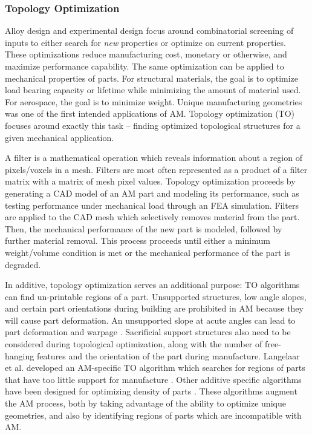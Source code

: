 \subsubsection{Topology Optimization}
Alloy design and experimental design focus around combinatorial screening of inputs to either search for \textit{new} properties or optimize on current properties. These optimizations reduce manufacturing cost, monetary or otherwise, and maximize performance capability. The same optimization can be applied to mechanical properties of parts. For structural materials, the goal is to optimize load bearing capacity or lifetime while minimizing the amount of material used. For aerospace, the goal is to minimize weight. Unique manufacturing geometries was one of the first intended applications of AM. Topology optimization (TO) focuses around exactly this task -- finding optimized topological structures for a given mechanical application. 

A filter is a mathematical operation which reveals information about a region of pixels/voxels in a mesh. Filters are most often represented as a product of a filter matrix with a matrix of mesh pixel values. Topology optimization proceeds by generating a CAD model of an AM part and modeling its performance, such as testing performance under mechanical load through an FEA simulation. Filters are applied to the CAD mesh which selectively removes material from the part. Then, the mechanical performance of the new part is modeled, followed by further material removal. This process proceeds until either a minimum weight/volume condition is met or the mechanical performance of the part is degraded.

In additive, topology optimization serves an additional purpose: TO algorithms can find un-printable regions of a part. Unsupported structures, low angle slopes, and certain part orientations during building are prohibited in AM because they will cause part deformation. An unsupported slope at acute angles can lead to part deformation and warpage \cite{Gaynor2016}. Sacrificial support structures also need to be considered during topological optimization, along with the number of free-hanging features and the orientation of the part during manufacture. Langelaar et al. developed an AM-specific TO algorithm which searches for regions of parts that have too little support for manufacture \cite{Langelaar2016, Langelaar2017}. Other additive specific algorithms have been designed for optimizing density of parts \cite{Zegard2016}. These algorithms augment the AM process, both by taking advantage of the ability to optimize unique geometries, and also by identifying regions of parts which are incompatible with AM.
